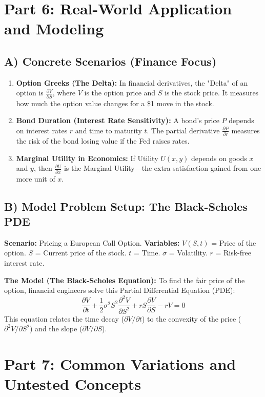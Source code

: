 \documentclass{article}
\begin{document}
\section{Part 6: Real-World Application and Modeling}

\subsection{A) Concrete Scenarios (Finance Focus)}
\begin{enumerate}
    \item \textbf{Option Greeks (The Delta):} In financial derivatives, the "Delta" of an option is $\frac{\partial V}{\partial S}$, where $V$ is the option price and $S$ is the stock price. It measures how much the option value changes for a \$1 move in the stock.
    \item \textbf{Bond Duration (Interest Rate Sensitivity):} A bond's price $P$ depends on interest rates $r$ and time to maturity $t$. The partial derivative $\frac{\partial P}{\partial r}$ measures the risk of the bond losing value if the Fed raises rates.
    \item \textbf{Marginal Utility in Economics:} If Utility $U(x, y)$ depends on goods $x$ and $y$, then $\frac{\partial U}{\partial x}$ is the Marginal Utility—the extra satisfaction gained from one more unit of $x$.
\end{enumerate}

\subsection{B) Model Problem Setup: The Black-Scholes PDE}
\textbf{Scenario:} Pricing a European Call Option.
\textbf{Variables:}
$V(S, t)$ = Price of the option.
$S$ = Current price of the stock.
$t$ = Time.
$\sigma$ = Volatility.
$r$ = Risk-free interest rate.

\textbf{The Model (The Black-Scholes Equation):}
To find the fair price of the option, financial engineers solve this Partial Differential Equation (PDE):
\[ \frac{\partial V}{\partial t} + \frac{1}{2}\sigma^2 S^2 \frac{\partial^2 V}{\partial S^2} + rS \frac{\partial V}{\partial S} - rV = 0 \]
This equation relates the time decay ($\partial V / \partial t$) to the convexity of the price ($\partial^2 V / \partial S^2$) and the slope ($\partial V / \partial S$).

\section{Part 7: Common Variations and Untested Concepts}
\end{document}
